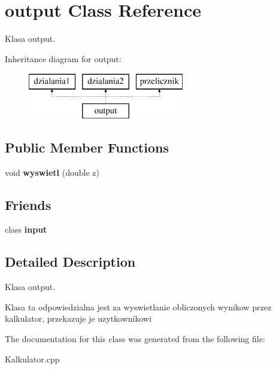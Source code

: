 \hypertarget{classoutput}{\section{output Class Reference}
\label{classoutput}
}


Klasa output.  


Inheritance diagram for output\+:\begin{figure}[H]
\begin{center}
\leavevmode
\includegraphics[height=2.000000cm]{classoutput}
\end{center}
\end{figure}
\subsection*{Public Member Functions}
\begin{DoxyCompactItemize}
\item 
\hypertarget{classoutput_a307621f93eddbd31f857bf90dac87f75}{void {\bfseries wyswietl} (double z)}\label{classoutput_a307621f93eddbd31f857bf90dac87f75}

\end{DoxyCompactItemize}
\subsection*{Friends}
\begin{DoxyCompactItemize}
\item 
\hypertarget{classoutput_a0a8814941837a9542fbb768e740fd03b}{class {\bfseries input}}\label{classoutput_a0a8814941837a9542fbb768e740fd03b}

\end{DoxyCompactItemize}


\subsection{Detailed Description}
Klasa output. 

Klasa ta odpowiedzialna jest za wyswietlanie obliczonych wynikow przez kalkulator, przekazuje je uzytkownikowi 

The documentation for this class was generated from the following file\+:\begin{DoxyCompactItemize}
\item 
Kalkulator.\+cpp\end{DoxyCompactItemize}

